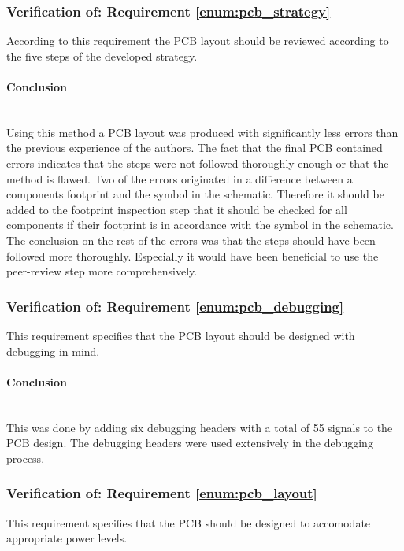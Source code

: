 \subsubsection{Verification of: Requirement \ref{enum:pcb_strategy}} %
\label{ssub:requirement_enum:pcb_strategy}
According to this requirement the PCB layout should be reviewed according to the five steps of the developed strategy.
\paragraph{Conclusion}~\\
Using this method a PCB layout was produced with significantly less errors than the previous experience of the authors.
The fact that the final PCB contained errors indicates that the steps were not followed thoroughly enough or that the method is flawed.
Two of the errors originated in a difference between a components footprint and the symbol in the schematic.
Therefore it should be added to the footprint inspection step that it should be checked for all components if their footprint is in accordance with the symbol in the schematic.
The conclusion on the rest of the errors was that the steps should have been followed more thoroughly.
Especially it would have been beneficial to use the peer-review step more comprehensively.

\subsubsection{Verification of: Requirement \ref{enum:pcb_debugging}} %
\label{ssub:requirement_enum:pcb_debugging}
This requirement specifies that the PCB layout should be designed with debugging in mind.
\paragraph{Conclusion}~\\
This was done by adding six debugging headers with a total of 55 signals to the PCB design.
The debugging headers were used extensively in the debugging process.

\subsubsection{Verification of: Requirement \ref{enum:pcb_layout}} %
\label{ssub:requirement_enum:pcb_layout}
This requirement specifies that the PCB should be designed to accomodate appropriate power levels.
